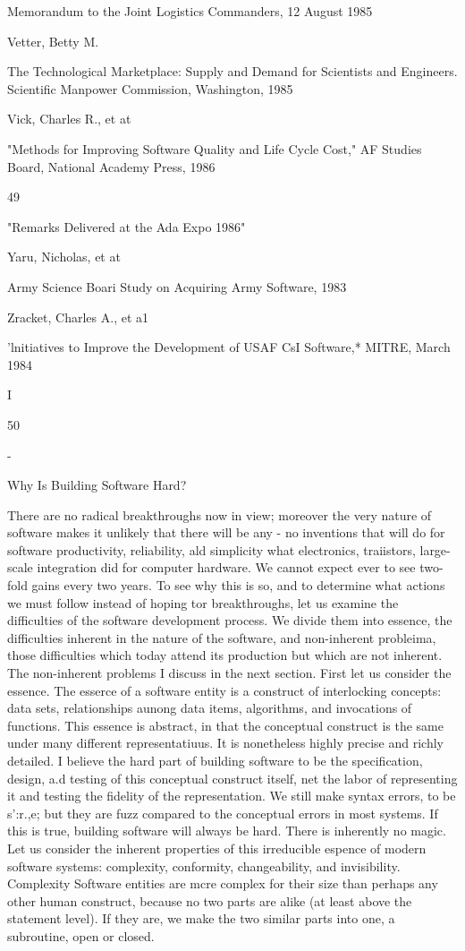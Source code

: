 \documentclass[12pt]{article}
\begin{document}
Memorandum to the Joint Logistics Commanders,
12 August 1985

Vetter, Betty M.

The Technological Marketplace: Supply and Demand
for Scientists and Engineers. Scientific Manpower Commission,
Washington, 1985

Vick, Charles R., et at

"Methods for Improving Software Quality and Life Cycle
Cost," AF Studies Board, National Academy Press, 1986

49


"Remarks Delivered at the Ada Expo 1986"

Yaru, Nicholas, et at

Army Science Boari Study on Acquiring Army Software, 1983

Zracket, Charles A., et a1

'lnitiatives to Improve the Development of USAF CsI
Software,* MITRE, March 1984

I

50


-

Why Is Building Software Hard?

There are no radical breakthroughs now in view; moreover the very nature of software
makes it unlikely that there will be any - no inventions that will do for software
productivity, reliability, ald simplicity what electronics, traiistors, large-scale integration
did for computer hardware. We cannot expect ever to see two-fold gains every two years.
To see why this is so, and to determine what actions we must follow instead of hoping
tor breakthroughs, let us examine the difficulties of the software development process.
We divide them into essence, the difficulties inherent in the nature of the software, and
non-inherent probleima, those difficulties which today attend its production but which are
not inherent.
The non-inherent problems I discuss in the next section. First let us consider the
essence.
The esserce of a software entity is a construct of interlocking concepts: data sets,
relationships aunong data items, algorithms, and invocations of functions. This essence is
abstract, in that the conceptual construct is the same under many different representatiuus.
It is nonetheless highly precise and richly detailed.
I believe the hard part of building software to be the specification, design, a.d testing
of this conceptual construct itself, net the labor of representing it and testing the fidelity
of the representation. We still make syntax errors, to be s':r.,e; but they are fuzz compared
to the conceptual errors in most systems.
If this is true, building software will always be hard. There is inherently no magic.
Let us consider the inherent properties of this irreducible espence of modern software
systems: complexity, conformity, changeability, and invisibility.
Complexity
Software entities are mcre complex for their size than perhaps any other human
construct, because no two parts are alike (at least above the statement level). If they
are, we make the two similar parts into one, a subroutine, open or closed.
\end{document}

